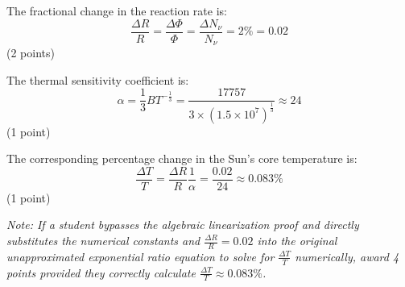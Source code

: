 \begin{description}
  The fractional change in the reaction rate is:
  \[ \frac{\Delta R}{R} = \frac{\Delta\Phi}{\Phi} = \frac{\Delta N_\nu}{N_\nu}
     = 2\% = 0.02 \]
  \hfill(2 points)

  The thermal sensitivity coefficient is:
  \[ \alpha = \frac{1}{3}BT^{-\frac{1}{3}}
     = \frac{17757}{3 \times (1.5 \times 10^7)^{\frac{1}{3}}} \approx 24 \]
  \hfill(1 point)

  The corresponding percentage change in the Sun's core temperature is:
  \[ \frac{\Delta T}{T} = \frac{\Delta R}{R}\frac{1}{\alpha}
     = \frac{0.02}{24} \approx 0.083\% \]
  \hfill(1 point)

  \textit{Note: If a student bypasses the algebraic linearization proof and
  directly substitutes the numerical constants and
  $\frac{\Delta R}{R} = 0.02$ into the original unapproximated exponential
  ratio equation to solve for $\frac{\Delta T}{T}$ numerically, award 4
  points provided they correctly calculate
  $\frac{\Delta T}{T} \approx 0.083\%$.}
\end{description}
